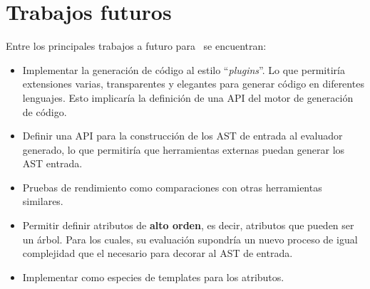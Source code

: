 \section{Trabajos futuros}
Entre los principales trabajos a futuro para \maggen\ se encuentran:
\begin{itemize}
\item Implementar la generación de código al estilo ``\textit{plugins}''. Lo que permitiría extensiones varias, transparentes y elegantes para generar código en diferentes lenguajes. Esto implicaría la definición de una API del motor de generación de código.

\item Definir una API para la construcción de los AST de entrada al evaluador generado, lo que permitiría que herramientas externas puedan generar los AST entrada. 
\item Pruebas de rendimiento como comparaciones con otras herramientas similares.

\item Permitir definir atributos de \textbf{alto orden}, es decir, atributos que pueden ser un árbol. Para los cuales, su evaluación supondría un nuevo proceso de igual complejidad que el necesario para decorar al AST de entrada.
\item Implementar como especies de templates para los atributos.

\end{itemize}
